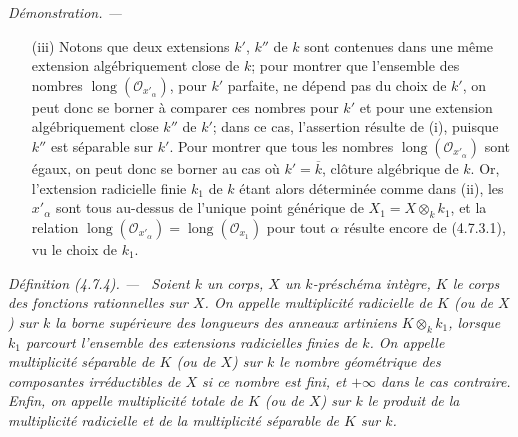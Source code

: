 \documentclass[10pt,oneside]{book}
\newcommand{\oldpage}[2][]{%
  \setcounter{footnote}{0}%
  \marginpar{\scriptsize\textbf{#1}~|~#2}\ignorespaces}
\newenvironment{definition}[1][]{%
  \par\medskip\noindent\itshape Définition (#1). ---\ }{\par}
\newenvironment{proof}{%
  \par\medskip\noindent\textit{Démonstration. ---\ }}{\par}
\begin{document}
\begin{proof}
\begin{enumerate}
Supposons ensuite que $X$ soit localement de type fini sur $k$; alors, $X''$
est localement noethérien pour toute extension $k''$ de $k'$. Prenant pour
$k''$ une extension algébriquement close de $k'$, on est ramené, en vertu de
(4.7.3.1), à prouver l'assertion lorsque $k'$ est algébriquement clos. Comme
$k'$ est alors une extension séparable de la clôture algébrique $\overline k$
de $k$, il résulte encore de (i) qu'on est ramené au cas où
$k'=\overline k$. Or, on sait (en remplaçant $X$ par un ouvert affine de type
fini sur $k$) qu'il y a une extension radicielle

\oldpage[IV-2]{77}

finie $k_1$ de $k$ telle que
$(X\otimes_k k_1)_{\mathrm{red}}$ soit séparable sur $k_1$ (4.6.6); donc
$(X\otimes_k k_1)_{\mathrm{red}}\otimes_{k_1}\overline k$ est réduit
(4.6.4). En vertu de (4.7.3.1), on est donc de nouveau ramené au cas où $k'$
est une extension finie radicielle de $k$, et on conclut comme plus haut.

\item[(iii)] Notons que deux extensions $k'$, $k''$ de $k$ sont contenues
dans une même extension algébriquement close de $k$; pour montrer que
l'ensemble des nombres $\operatorname{long}(\mathcal O_{x'_\alpha})$, pour
$k'$ parfaite, ne dépend pas du choix de $k'$, on peut donc se borner à
comparer ces nombres pour $k'$ et pour une extension algébriquement close
$k''$ de $k'$; dans ce cas, l'assertion résulte de (i), puisque $k''$ est
séparable sur $k'$. Pour montrer que tous les nombres
$\operatorname{long}(\mathcal O_{x'_\alpha})$ sont égaux, on peut donc se
borner au cas où $k'=\overline k$, clôture algébrique de $k$. Or, l'extension
radicielle finie $k_1$ de $k$ étant alors déterminée comme dans (ii), les
$x'_\alpha$ sont tous au-dessus de l'unique point générique de
$X_1=X\otimes_k k_1$, et la relation
$\operatorname{long}(\mathcal O_{x'_\alpha})=
\operatorname{long}(\mathcal O_{x_1})$ pour tout $\alpha$ résulte encore de
(4.7.3.1), vu le choix de $k_1$.
\end{enumerate}
\end{proof}

\begin{definition}[4.7.4]
\label{IV.2.4.7.4-fr}
Soient $k$ un corps, $X$ un $k$-préschéma intègre, $K$ le corps des fonctions
rationnelles sur $X$. On appelle \emph{multiplicité radicielle} de $K$ (ou de
$X$) sur $k$ la borne supérieure des longueurs des anneaux artiniens
$K\otimes_k k_1$, lorsque $k_1$ parcourt l'ensemble des extensions
radicielles finies de $k$. On appelle \emph{multiplicité séparable} de $K$ (ou
de $X$) sur $k$ le nombre géométrique des composantes irréductibles de $X$ si
ce nombre est fini, et $+\infty$ dans le cas contraire. Enfin, on appelle
\emph{multiplicité totale} de $K$ (ou de $X$) sur $k$ le produit de la
multiplicité radicielle et de la multiplicité séparable de $K$ sur $k$.
\end{definition}
\end{document}
